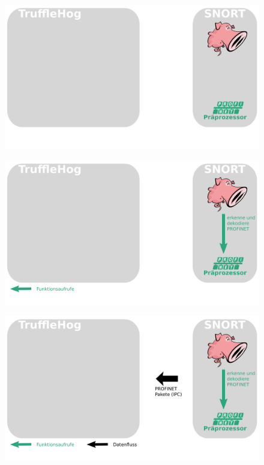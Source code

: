 \documentclass[18pt]{beamer}
\begin{document}
\begin{frame}
    \begin{figure}
    	\centering
    	\includegraphics[width=\textwidth]{./images/jan_3.png}
    \end{figure}
\end{frame}

\begin{frame}
    \begin{figure}
    	\centering
    	\includegraphics[width=\textwidth]{./images/jan_4.png}
    \end{figure}
\end{frame}

\begin{frame}
    \begin{figure}
    	\centering
    	\includegraphics[width=\textwidth]{./images/jan_5.png}
    \end{figure}
\end{frame}
\end{document}
